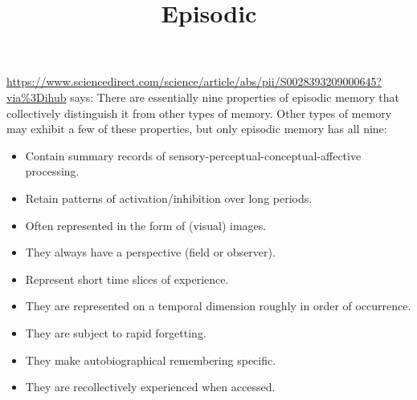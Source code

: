 \documentclass[a4paper]{article}
\title{Episodic}
\begin{document}
    \maketitle
    \url{https://www.sciencedirect.com/science/article/abs/pii/S0028393209000645?via%3Dihub} says:
    There are essentially nine properties of episodic memory that collectively distinguish it from other types of memory. Other types of memory may exhibit a few of these properties, but only episodic memory has all nine:
    
    \begin{itemize}
        \item Contain summary records of sensory-perceptual-conceptual-affective processing.
        \item Retain patterns of activation/inhibition over long periods.
        \item Often represented in the form of (visual) images.
        \item They always have a perspective (field or observer).
        \item Represent short time slices of experience.
        \item They are represented on a temporal dimension roughly in order of occurrence.
        \item They are subject to rapid forgetting.
        \item They make autobiographical remembering specific.
        \item They are recollectively experienced when accessed.
    \end{itemize}
\end{document}
